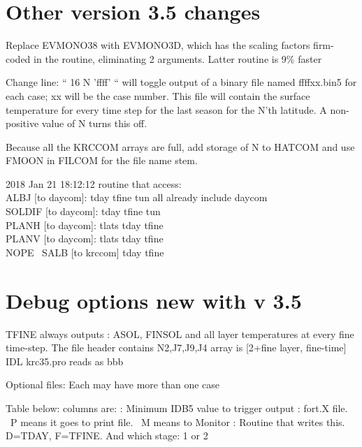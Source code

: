 \documentclass{article}
\begin{document}
\section{Other version 3.5 changes}
Replace EVMONO38 with EVMONO3D, which has the scaling factors firm-coded in the
routine, eliminating 2 arguments. Latter routine is 9\% faster

Change line: ``  16 N 'ffff' `` will toggle output of a binary file named ffffxx.bin5 for
each case; xx will be the case number. This file will contain the surface
temperature for every time step for the last season for the N'th latitude. A
non-positive value of N turns this off.

Because all the KRCCOM arrays are full, add storage of N to HATCOM and use FMOON in FILCOM for the file name stem.

2018 Jan 21 18:12:12
routine that access:
\\ ALBJ [to daycom]:  tday tfine tun   all already include daycom
\\ SOLDIF [to daycom]: tday tfine tun
\\ PLANH  [to daycom]: tlats tday tfine 
\\ PLANV  [to daycom]: tlats tday tfine 
\\ NOPE  \ SALB [to krccom]  tday tfine


\appendix %


\section{Debug options new with v 3.5}

TFINE always outputs : ASOL, FINSOL
and all layer temperatures at every fine time-step. 
\qi The file header contains N2,J7,J9,J4 
\qi array is [2+fine layer, fine-time]  \hfill IDL krc35.pro reads as bbb

Optional files:  Each may have more than one case

Table below: columns are:
: Minimum IDB5 value to trigger output
: fort.X file. \  P means it goes to print file. \ M means to Monitor
: Routine that writes this. D=TDAY, F=TFINE. And which stage: 1 or 2
\end{document}

